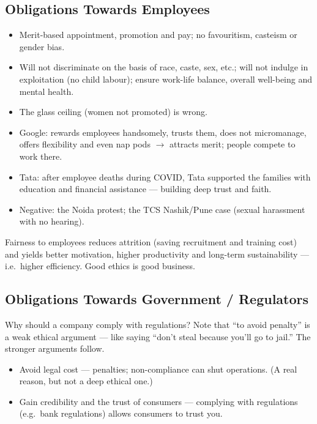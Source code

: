 \subsection{Obligations Towards Employees}
\begin{itemize}
\item Merit-based appointment, promotion and pay; no favouritism, casteism or gender bias.
\item Will not discriminate on the basis of race, caste, sex, etc.; will not indulge in exploitation (no child labour); ensure work-life balance, overall well-being and mental health.
\item The glass ceiling (women not promoted) is wrong.
\end{itemize}

\begin{ExampleBox}
\begin{itemize}
\item Google: rewards employees handsomely, trusts them, does not micromanage, offers flexibility and even nap pods $\rightarrow$ attracts merit; people compete to work there.
\item Tata: after employee deaths during COVID, Tata supported the families with education and financial assistance --- building deep trust and faith.
\item Negative: the Noida protest; the TCS Nashik/Pune case (sexual harassment with no hearing).
\end{itemize}
\end{ExampleBox}

\begin{KeyConcept}
Fairness to employees reduces attrition (saving recruitment and training cost) and yields better motivation, higher productivity and long-term sustainability --- i.e.\ higher efficiency. Good ethics is good business.
\end{KeyConcept}

\subsection{Obligations Towards Government / Regulators}
Why should a company comply with regulations? Note that ``to avoid penalty'' is a weak ethical argument --- like saying ``don't steal because you'll go to jail.'' The stronger arguments follow.
\begin{itemize}
\item Avoid legal cost --- penalties; non-compliance can shut operations. (A real reason, but not a deep ethical one.)
\item Gain credibility and the trust of consumers --- complying with regulations (e.g.\ bank regulations) allows consumers to trust you.
\end{itemize}

